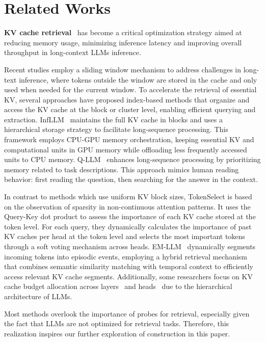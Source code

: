 \section{Related Works}


\textbf{KV cache retrieval}~\cite{adnan2024keyformer,zhang2023h2o,xiao2025duoattention} has become a critical optimization strategy aimed at reducing memory usage, minimizing inference latency and improving overall throughput in long-context LLMs inference. 

Recent studies employ a sliding window mechanism to address challenges in long-text inference, where tokens outside the window are stored in the cache and only used when needed for the current window. 
To accelerate the retrieval of essential KV, several approaches have proposed index-based methods that organize and access the KV cache at the block or cluster level, enabling efficient querying and extraction. InfLLM~\cite{infllm} maintains the full KV cache in blocks and uses a hierarchical storage strategy to facilitate long-sequence processing. This framework employs CPU-GPU memory orchestration, keeping essential KV and computational units in GPU memory while offloading less frequently accessed units to CPU memory. Q-LLM~\cite{qllm} enhances long-sequence processing by prioritizing memory related to task descriptions. This approach mimics human reading behavior: first reading the question, then searching for the answer in the context. 

In contrast to methods which use uniform KV block sizes, TokenSelect\cite{tokenselect} is based on the observation of sparsity in non-continuous attention patterns. It uses the Query-Key dot product to assess the importance of each KV cache stored at the token level. For each query, they dynamically calculates the importance of past KV caches per head at the token level and selects the most important tokens through a soft voting mechanism across heads. EM-LLM~\cite{emllm} dynamically segments incoming tokens into episodic events, employing a hybrid retrieval mechanism that combines semantic similarity matching with temporal context to efficiently access relevant KV cache segments. Additionally, some researchers focus on KV cache budget allocation across layers~\cite{cai2024pyramidkv, yang-etal-2024-pyramidinfer} and heads~\cite{feng2024ada, fu2025not} due to the hierarchical architecture of LLMs.

Most methods overlook the importance of probes for retrieval, especially given the fact that LLMs are not optimized for retrieval tasks. Therefore, this realization inspires our further exploration of \pq construction in this paper.



